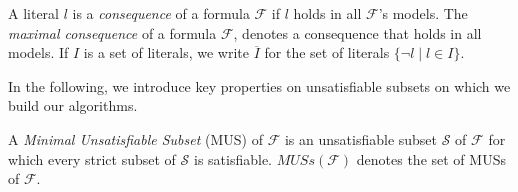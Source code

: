 \documentclass[a4paper,UKenglish,cleveref, autoref, thm-restate, pdfa]{lipics-v2021}
\newcommand\m[1]{\mathcal{#1}}
\renewcommand\comment[1]{}
\newcommand{\tias}[1]{{\comment{\color{blue}Tias:#1}}}
\newcommand{\bart}[1]{{\comment{\color{OliveGreen}Bart: #1}}}
\newcommand\F{\ensuremath{\m{F} }\xspace}
\newcommand\Iend{\ensuremath{I_\mathit{end} }\xspace}
\newcommand\formula{\ensuremath{\m{F} }\xspace}
\newcommand\formulac{\ensuremath{\m{C} }\xspace}
\newcommand\mm[1]{\ensuremath{#1}\xspace}
\newcommand\negset[1]{\mm{\overline{#1}}}
\newcommand\muses[1]{\ensuremath{\mathit{MUSs}(#1)}\xspace}
\begin{document}
	A literal $l$ is a \emph{consequence} of a formula \formula if $l$ holds in all $\formula$'s models. The \emph{maximal consequence} of a formula \formula, denotes a consequence that holds in all models.
	If $I$ is a set of literals, we write $\negset{I}$ for the set of literals $\{\lnot l\mid l\in I\}$.
	
	
	In the following, we introduce key properties on unsatisfiable subsets on which we build our algorithms.
	
	\begin{definition}
		A \emph{Minimal Unsatisfiable Subset} (MUS) of 
		\F is an unsatisfiable subset $\m{S}$ of $\F$ for which every strict subset of $\m{S} $ is satisfiable. 
		\muses{\F} denotes the set of MUSs of \F. 
	\end{definition}
	
\end{document}
